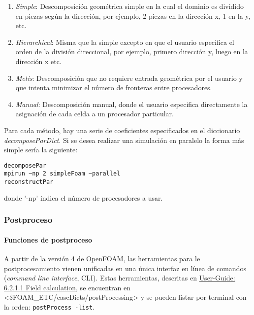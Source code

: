 \begin{enumerate}
\def\labelenumi{\arabic{enumi}.}
\item
  \emph{Simple}: Descomposición geométrica simple en la cual el dominio
  es dividido en piezas según la dirección, por ejemplo, 2 piezas en la
  dirección x, 1 en la y, etc.
\item
  \emph{Hierarchical}: Misma que la simple excepto en que el usuario
  especifica el orden de la división direccional, por ejemplo, primero
  dirección y, luego en la dirección x etc.
\item
  \emph{Metis}: Descomposición que no requiere entrada geométrica por el
  usuario y que intenta minimizar el número de fronteras entre
  procesadores.
\item
  \emph{Manual}: Descomposición manual, donde el usuario especifica
  directamente la asignación de cada celda a un procesador particular.
\end{enumerate}

Para cada método, hay una serie de coeficientes especificados en el
diccionario \emph{decomposeParDict}. Si se desea realizar una simulación
en paralelo la forma más simple sería la siguiente:

\begin{verbatim}
decomposePar
mpirun −np 2 simpleFoam −parallel
reconstructPar
\end{verbatim}

donde '-np' indica el número de procesadores a usar.

\subsubsection{Postproceso}\label{header-n376}

\paragraph{Funciones de postproceso}\label{header-n379}

A partir de la versión 4 de OpenFOAM, las herramientas para le
postprocesamiento vienen unificadas en una única interfaz en línea de
comandos (\emph{command line interface}, CLI). Estas herramientas,
descritas en
\href{http://cfd.direct/openfoam/user-guide/post-processing-cli/\#x31-2400006.2.3}{User-Guide:
6.2.1.1 Field calculation}, se encuentran en
\textless{}\$FOAM\_ETC/caseDicts/postProcessing\textgreater{} y se
pueden listar por terminal con la orden: \texttt{postProcess\ -list}.

